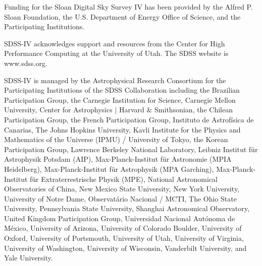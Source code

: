 \documentclass[twocolumn, tighten, times, astrosymb]{aastex631}
\begin{document}
\begin{acknowledgments}
Funding for the Sloan Digital Sky Survey IV has been provided by the Alfred P. Sloan Foundation, the U.S. Department of Energy Office of Science, and the Participating Institutions. 

SDSS-IV acknowledges support and resources from the Center for High Performance Computing  at the University of Utah. The SDSS website is www.sdss.org.

SDSS-IV is managed by the Astrophysical Research Consortium for the Participating Institutions of the SDSS Collaboration including the Brazilian Participation Group, the Carnegie Institution for Science, Carnegie Mellon University, Center for Astrophysics $|$ Harvard \& Smithsonian, the Chilean Participation Group, the French Participation Group, Instituto de Astrof\'isica de Canarias, The Johns Hopkins University, Kavli Institute for the Physics and Mathematics of the Universe (IPMU) / University of Tokyo, the Korean Participation Group, Lawrence Berkeley National Laboratory, Leibniz Institut f\"ur Astrophysik Potsdam (AIP),  Max-Planck-Institut f\"ur Astronomie (MPIA Heidelberg), Max-Planck-Institut f\"ur Astrophysik (MPA Garching), Max-Planck-Institut f\"ur Extraterrestrische Physik (MPE), National Astronomical Observatories of China, New Mexico State University, New York University, University of Notre Dame, Observat\'ario Nacional / MCTI, The Ohio State University, Pennsylvania State University, Shanghai Astronomical Observatory, United Kingdom Participation Group, Universidad Nacional Aut\'onoma de M\'exico, University of Arizona, University of Colorado Boulder, University of Oxford, University of Portsmouth, University of Utah, University of Virginia, University of Washington, University of Wisconsin, Vanderbilt University, and Yale University.
\end{acknowledgments}

{}



\end{document}
